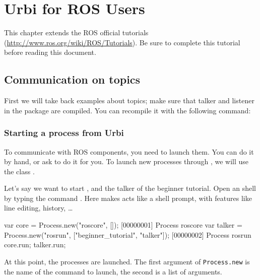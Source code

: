 \chapter{Urbi for ROS Users}
\label{sec:tut:ros}


This chapter extends the ROS official tutorials
(\url{http://www.ros.org/wiki/ROS/Tutorials}).  Be sure to complete this
tutorial before reading this document.

\section{Communication on topics}

First we will take back examples about topics; make sure that talker and
listener in the  package are compiled. You can
recompile it with the following command:


\subsection{Starting a process from Urbi}

To communicate with ROS components, you need to launch them. You can do it
by hand, or ask \urbi to do it for you. To launch new processes through
\urbi, we will use the class .

Let's say we want to start , and the talker of the beginner
tutorial.  Open an \urbi shell by typing the command .  Here  makes  acts like a shell prompt,
with features like line editing, history, \ldots

\begin{urbiunchecked}
var core = Process.new("roscore", []);
[00000001] Process roscore
var talker = Process.new("rosrun", ["beginner_tutorial", "talker"]);
[00000002] Process rosrun
core.run;
talker.run;
\end{urbiunchecked}

At this point, the processes are launched. The first argument of
\lstinline{Process.new} is the name of the command to launch, the second is
a list of arguments.

